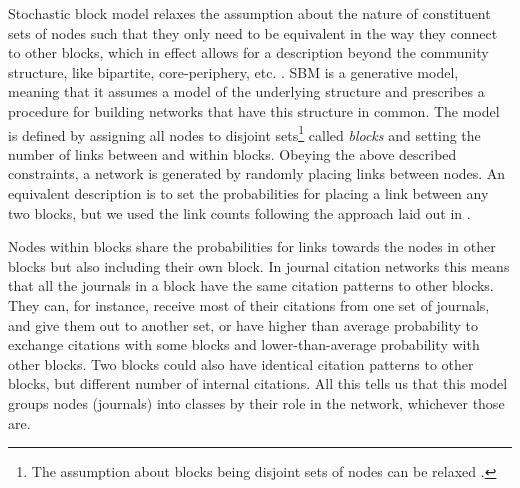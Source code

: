 \documentclass[a4paper,12pt]{article}
\begin{document}
Stochastic block model relaxes the assumption about the nature of constituent sets of nodes such that they only need to be equivalent in the way they connect to other blocks, which in effect 
allows for a description beyond the community structure, like bipartite, core-periphery, 
etc. \citep{Karrer2011,Barucca2016}.
SBM is a generative model, meaning that it assumes a model of the underlying structure
and prescribes a procedure for building networks that have this structure in common.
The model is defined by assigning all nodes to disjoint sets\footnote{The assumption about blocks being disjoint sets of nodes can be relaxed \citep{Peixoto_model_2014}.} called \emph{blocks} and setting the number of links between and within blocks. Obeying the above described constraints, a network is generated  by randomly placing links between nodes. An equivalent description is to set 
the probabilities for placing a link between any two blocks, but we used the link counts
following the approach laid out in \citet{Peixoto_hierarchical_2014}.

Nodes within blocks share the probabilities for links towards the nodes in other blocks but also including their own block. In journal citation networks this means that all the journals in a block have the same citation patterns to other blocks.
They can, for instance, receive most of their citations from one set of journals, and give them out to another set, 
or have higher than average probability to exchange citations with some blocks and lower-than-average probability
with other blocks. Two blocks could also have identical citation patterns to other blocks, but different number of internal citations.
All this tells us that this model groups nodes (journals) into classes by their role in the network, whichever those are.
\end{document}
